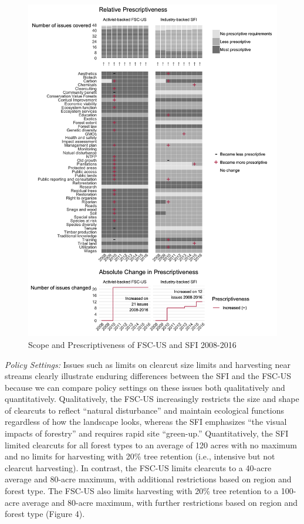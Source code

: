 \documentclass[
      12pt,
            Review ]{article}
\begin{document}
\begin{figure}
\centering
\includegraphics{FSC-SFI-1.png}
\caption{Scope and Prescriptiveness of FSC-US and SFI 2008-2016}
\end{figure}

\emph{Policy Settings:} Issues such as limits on clearcut size limits and harvesting near streams clearly illustrate enduring differences between the SFI and the FSC-US because we can compare policy settings on these issues both qualitatively and quantitatively. Qualitatively, the FSC-US increasingly restricts the size and shape of clearcuts to reflect ``natural disturbance'' and maintain ecological functions regardless of how the landscape looks, whereas the SFI emphasizes ``the visual impacts of forestry'' and requires rapid site ``green-up.'' Quantitatively, the SFI limited clearcuts for all forest types to an average of 120 acres with no maximum and no limits for harvesting with 20\% tree retention (i.e., intensive but not clearcut harvesting). In contrast, the FSC-US limits clearcuts to a 40-acre average and 80-acre maximum, with additional restrictions based on region and forest type. The FSC-US also limits harvesting with 20\% tree retention to a 100-acre average and 80-acre maximum, with further restrictions based on region and forest type (Figure 4).
\end{document}
